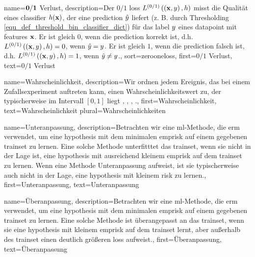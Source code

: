 {{{{
{name={$\bf 0/1$ Verlust},
	description={Der $0/1$ \gls{loss} $L^{(0/1)}\left(\left( {\bf x},y \right),h \right)$ misst die Qualität eines \gls{classifier} $h({\bf x})$, der eine \gls{prediction} $\hat{y}$ liefert (z. B. durch Thresholding \eqref{equ_def_threshold_bin_classifier_dict}) für das \gls{label} $y$ eines \gls{datapoint} mit \gls{feature}s ${\bf x}$. Er ist gleich $0$, wenn die \gls{prediction} korrekt ist, d.h. $L^{(0/1)}\left(\left( {\bf x},y \right),h \right)=0$, wenn $\hat{y}=y$. Er ist gleich $1$, wenn die \gls{prediction} falsch ist, d.h. $L^{(0/1)}\left(\left( {\bf x},y \right),h \right)=1$, wenn $\hat{y} \neq y$.},
	sort=zerooneloss,
	first={$0/1$ Verlust},
	text={$0/1$ Verlust}
}
		 
{name={Wahrscheinlichkeit},
	description={Wir ordnen jedem Ereignis, das bei einem Zufallsexperiment auftreten kann, einen Wahrscheinlichkeitswert zu, der typischerweise im Intervall $[0,1]$ liegt \cite{BertsekasProb}, \cite{HalmosMeasure}, \cite{BillingsleyProbMeasure}, \cite{KallenbergBook}.},
	first={Wahrscheinlichkeit},
	text={Wahrscheinlichkeit}
	plural={Wahrscheinlichkeiten}
}

{name={Unteranpassung},
	description={Betrachten wir eine \gls{ml}-Methode, die \gls{erm} verwendet, um eine \gls{hypothesis} mit dem minimalen \gls{emprisk} auf einem gegebenen \gls{trainset} zu lernen. Eine solche Methode unterfitttet das \gls{trainset}, wenn sie nicht in der Lage ist, eine \gls{hypothesis} mit ausreichend kleinem \gls{emprisk} auf dem \gls{trainset} zu lernen. Wenn eine Methode Unteranpassung aufweist, ist sie typischerweise auch nicht in der Lage, eine \gls{hypothesis} mit kleinem \gls{risk} zu lernen.},
	first={Unteranpassung},
	text={Unteranpassung}
}


{name={Überanpassung}},
	description={Betrachten wir eine \gls{ml}-Methode, die \gls{erm} verwendet, um eine \gls{hypothesis} mit dem minimalen \gls{emprisk} auf einem gegebenen \gls{trainset} zu lernen. Eine solche Methode ist überangepasst an das \gls{trainset}, wenn sie eine \gls{hypothesis} mit kleinem \gls{emprisk} auf dem \gls{trainset} lernt, aber außerhalb des \gls{trainset} einen deutlich größeren \gls{loss} aufweist.},
	first={Überanpassung},
	text=Überanpassung}
                        
    }

}}

